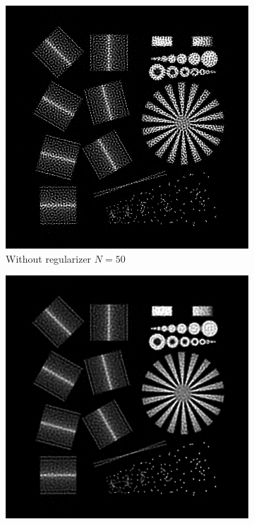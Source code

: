 \documentclass{juliacon}
\begin{document}
\begin{figure}[h]
\begin{subfigure}[b]{.25\textwidth}
                \includegraphics[width=\textwidth]{figures/resolution_test_chart_no_reg_iter_50.png}
                \caption{Without regularizer $N=50$}
                \label{fig:fabiob}
            \end{subfigure}%
            \hfill
            \begin{subfigure}[b]{.25\textwidth}
                \centering
                \includegraphics[width=\textwidth]{figures/resolution_test_chart_no_reg_iter_10.png}

\end{subfigure}
\end{figure}
\end{document}

